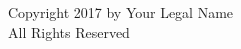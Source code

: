 \thispagestyle{empty}

\begin{center}
	\vspace*{\fill}
	Copyright 2017 by Your Legal Name\\
	All Rights Reserved	
	\vspace*{\fill}
\end{center}

